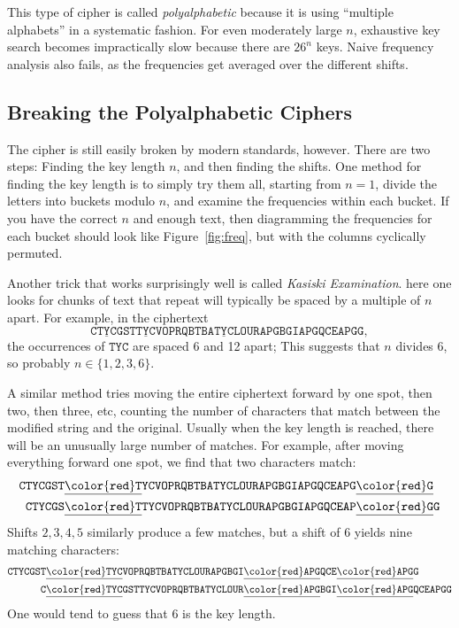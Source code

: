 \documentclass[11pt]{article}
\begin{document}
This type of cipher is called \emph{polyalphabetic} because it is using
``multiple alphabets'' in a systematic fashion. For even moderately
large $n$, exhaustive key search becomes impractically slow because
there are $26^n$ keys. Naive frequency analysis also fails, as the
frequencies get averaged over the different shifts.

\subsection{Breaking the Polyalphabetic Ciphers}

The cipher is still easily broken by modern standards, however. There are two
steps: Finding the key length $n$, and then finding the shifts. One method for
finding the key length is to simply try them all, starting from $n=1$, divide
the letters into buckets modulo $n$, and examine the frequencies within each
bucket. If you have the correct $n$ and enough text, then diagramming the
frequencies for each bucket should look like Figure~\ref{fig:freq}, but with
the columns cyclically permuted.

Another trick that works surprisingly well is called \emph{Kasiski Examination}.
here one looks for chunks of text that repeat will typically be spaced
by a multiple of $n$ apart. For example, in the ciphertext
\[
    \mathtt{C\underline{TYC}GST\underline{TYC}VOPRQBTBA\underline{TYC}LOURAPGBGIAPGQCEAPGG},
\]
the occurrences of $\mathtt{TYC}$ are spaced 6 and 12 apart; This suggests
that $n$ divides $6$, so probably $n\in\{1,2,3,6\}$.

A similar method tries moving the entire ciphertext forward by one spot, then
two, then three, etc, counting the number of characters that match between the
modified string and the original. Usually when the key length is reached,
there will be an unusually large number of matches.
For example, after moving everything forward
one spot, we find that two characters match:
\begin{align*}
    & \mathtt{CTYCGST\underline{\color{red}T}YCVOPRQBTBATYCLOURAPGBGIAPGQCEAPG\underline{\color{red}G}} \\
    & \mathtt{\phantom{\mathtt{X}}CTYCGS\underline{\color{red}T}TYCVOPRQBTBATYCLOURAPGBGIAPGQCEAP\underline{\color{red}G}G} 
\end{align*}
Shifts $2,3,4,5$ similarly produce a few matches, but
a shift of $6$ yields nine matching characters:
\begin{align*}
    & \mathtt{CTYCGST\underline{\color{red}TYC}VOPRQBTBATYCLOURAPGBGI\underline{\color{red}APG}QCE\underline{\color{red}APG}G} \\
    & \mathtt{\phantom{\mathtt{000000}}C\underline{\color{red}TYC}GSTTYCVOPRQBTBATYCLOUR\underline{\color{red}APG}BGI\underline{\color{red}APG}QCEAPGG} 
\end{align*}
One would tend to guess that $6$ is the key length.
\end{document}
